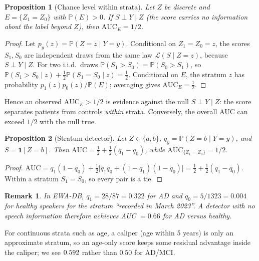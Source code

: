 \documentclass[10pt]{article}
\newtheorem{proposition}{Proposition}
\newtheorem{remark}{Remark}
\newcommand{\AUC}{\mathrm{AUC}}
\newcommand{\Prob}{\mathbb{P}}
\begin{document}
\begin{proposition}[Chance level within strata]\label{prop:chance}
Let $Z$ be discrete and $E=\{Z_1=Z_0\}$ with $\Prob(E)>0$. If $S\perp Y\mid Z$ (the score carries no information about the label beyond $Z$), then $\AUC_E=1/2$.
\end{proposition}
\begin{proof}
Let $p_y(z)=\Prob(Z=z\mid Y=y)$. Conditional on $Z_1=Z_0=z$, the scores $S_1,S_0$ are independent draws from the same law $\mathcal L(S\mid Z=z)$, because $S\perp Y\mid Z$. For two i.i.d.\ draws $\Prob(S_1>S_0)=\Prob(S_0>S_1)$, so $\Prob(S_1>S_0\mid z)+\tfrac12\Prob(S_1=S_0\mid z)=\tfrac12$. Conditional on $E$, the stratum $z$ has probability $p_1(z)p_0(z)/\Prob(E)$; averaging gives $\AUC_E=\tfrac12$. \qedhere
\end{proof}
Hence an observed $\AUC_E>1/2$ is evidence against the null $S\perp Y\mid Z$: the score separates patients from controls \emph{within} strata. Conversely, the overall AUC can exceed $1/2$ with the null true.

\begin{proposition}[Stratum detector]\label{prop:detector}
Let $Z\in\{a,b\}$, $q_y=\Prob(Z=b\mid Y=y)$, and $S=\mathbf 1[Z=b]$. Then $\AUC=\tfrac12+\tfrac12(q_1-q_0)$, while $\AUC_{\{Z_1=Z_0\}}=1/2$.
\end{proposition}
\begin{proof}
$\AUC=q_1(1-q_0)+\tfrac12\bigl[q_1q_0+(1-q_1)(1-q_0)\bigr]=\tfrac12+\tfrac12(q_1-q_0)$. Within a stratum $S_1=S_0$, so every pair is a tie. \qedhere
\end{proof}
\begin{remark}
In EWA-DB, $q_1=28/87=0.322$ for AD and $q_0=5/1323=0.004$ for healthy speakers for the stratum ``recorded in March 2023''. A detector with no speech information therefore achieves AUC $=0.66$ for AD versus healthy.
\end{remark}
For continuous strata such as age, a caliper (age within 5 years) is only an approximate stratum, so an age-only score keeps some residual advantage inside the caliper; we see $0.592$ rather than $0.50$ for AD/MCI.
\end{document}
